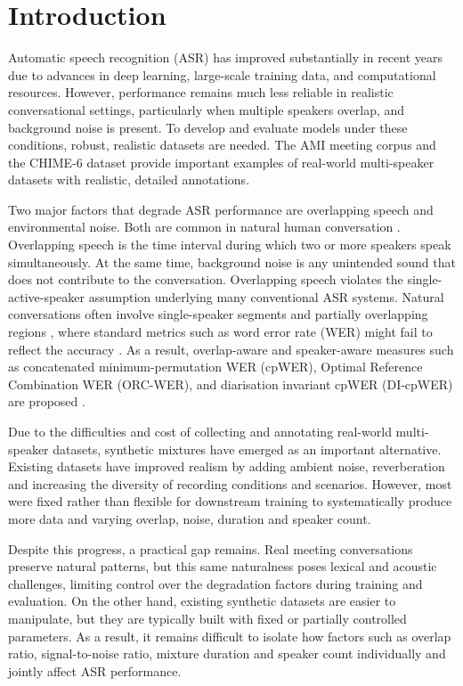 \chapter{Introduction}
\label{sec:introduction}
Automatic speech recognition (ASR) has improved substantially in recent years due to advances in deep learning, large-scale training data, and computational resources. However, performance remains much less reliable in realistic conversational settings, particularly when multiple speakers overlap, and background noise is present. To develop and evaluate models under these conditions, robust, realistic datasets are needed. The AMI meeting corpus \cite{ami-corpus} and the CHIME-6 dataset \cite{chime6} provide important examples of real-world multi-speaker datasets with realistic, detailed annotations.

Two major factors that degrade ASR performance are overlapping speech and environmental noise. Both are common in natural human conversation \citep{chen2020continuousspeechseparationdataset, Conversation_in_small_groups}. Overlapping speech is the time interval during which two or more speakers speak simultaneously. At the same time, background noise is any unintended sound that does not contribute to the conversation. Overlapping speech violates the single-active-speaker assumption underlying many conventional ASR systems. Natural conversations often involve single-speaker segments and partially overlapping regions \cite{chen2020continuousspeechseparationdataset}, where standard metrics such as word error rate (WER) might fail to reflect the accuracy \citep {ellis2026werunawareassessingasr, hughes2025problemwithwer}. As a result, overlap-aware and speaker-aware measures such as concatenated minimum-permutation WER (cpWER), Optimal Reference Combination WER (ORC-WER), and diarisation invariant cpWER (DI-cpWER) are proposed \citep{ Word_Error_Rate_Definitions}.

Due to the difficulties and cost of collecting and annotating real-world multi-speaker datasets, synthetic mixtures have emerged as an important alternative. Existing datasets have improved realism by adding ambient noise, reverberation and increasing the diversity of recording conditions and scenarios. However, most were fixed rather than flexible for downstream training to systematically produce more data and varying overlap, noise, duration and speaker count.

Despite this progress, a practical gap remains.  Real meeting conversations preserve natural patterns, but this same naturalness poses lexical and acoustic challenges, limiting control over the degradation factors during training and evaluation. On the other hand, existing synthetic datasets are easier to manipulate, but they are typically built with fixed or partially controlled parameters. As a result, it remains difficult to isolate how factors such as overlap ratio, signal-to-noise ratio, mixture duration and speaker count individually and jointly affect ASR performance.

